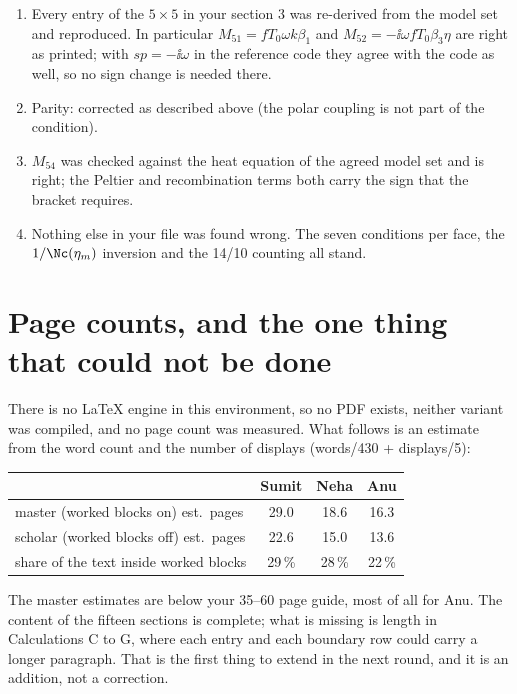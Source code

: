 \documentclass[11pt,a4paper]{article}
\begin{document}
\begin{enumerate}
\item Every entry of the $5\times5$ in your section 3 was re-derived from the model set and reproduced.
   In particular $M_{51}=fT_0\omega k\beta_1$ and $M_{52}=-\ii\omega fT_0\beta_3\eta$ are right as printed;
   with $sp=-\ii\omega$ in the reference code they agree with the code as well, so no sign change is needed
   there.
\item Parity: corrected as described above (the polar coupling is not part of the condition).
\item $M_{54}$ was checked against the heat equation of the agreed model set and is right; the Peltier and
   recombination terms both carry the sign that the bracket requires.
\item Nothing else in your file was found wrong. The seven conditions per face, the $1/\Nc(\eta_m)$
   inversion and the 14/10 counting all stand.
\end{enumerate}

\section*{Page counts, and the one thing that could not be done}

There is no LaTeX engine in this environment, so no PDF exists, neither variant was compiled, and no page
count was measured. What follows is an estimate from the word count and the number of displays
(words/430 + displays/5):

\begin{center}\footnotesize
\begin{tabular}{lccc}
\toprule
 & Sumit & Neha & Anu\\
\midrule
master (worked blocks on) est.\ pages & 29.0 & 18.6 & 16.3\\
scholar (worked blocks off) est.\ pages & 22.6 & 15.0 & 13.6\\
share of the text inside worked blocks & 29\,\% & 28\,\% & 22\,\%\\
\bottomrule
\end{tabular}
\end{center}

\noindent The master estimates are below your 35--60 page guide, most of all for Anu. The content of the
fifteen sections is complete; what is missing is length in Calculations C to G, where each entry and each
boundary row could carry a longer paragraph. That is the first thing to extend in the next round, and it is
an addition, not a correction.
\end{document}
